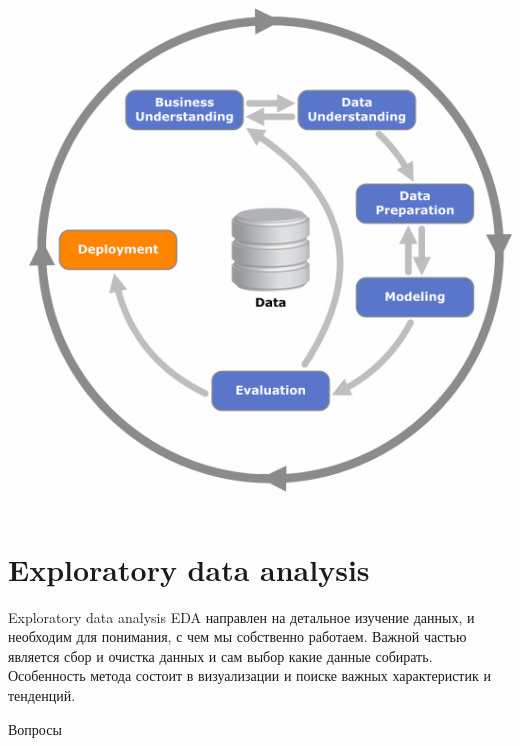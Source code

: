 \documentclass[10pt]{beamer}
\begin{document}
\begin{frame}{}

\begin{columns}[C]
    \begin{column}{.5\textwidth}
    	
    \end{column}
       
    \begin{column}{.5\textwidth}
    \vspace{-0em}
	\begin{center}
   		\includegraphics[width=\textwidth]{images/crisp-d.png}
    \end{center}
    \end{column}
  \end{columns}

\end{frame}

\section{Exploratory data analysis}

\begin{frame}{Exploratory data analysis}
EDA направлен на детальное изучение данных, и необходим для понимания, с чем мы собственно работаем. Важной частью является сбор и очистка данных и сам выбор какие данные собирать. Особенность метода состоит в визуализации и поиске важных характеристик и тенденций.
\end{frame}

\begin{frame}[plain]
\begin{center}
{\Large Вопросы}
\end{center}
\end{frame}
\end{document}
